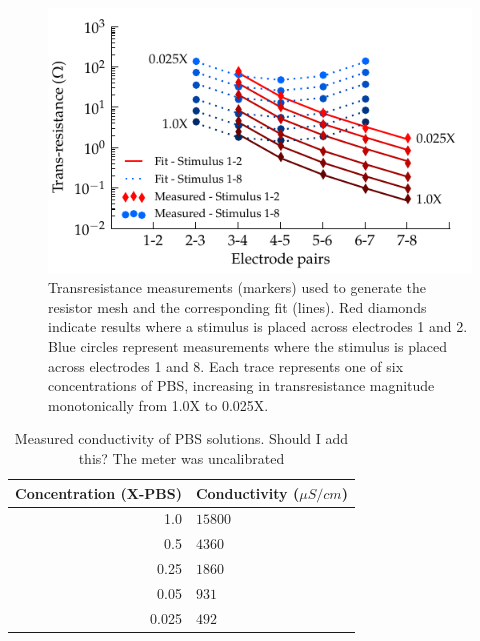 \documentclass[journal, a4paper]{IEEEtran}
\begin{document}
\begin{figure}
    \begin{center}
        \includegraphics{graphics/pbs_transimpedance_IEEE}
    \end{center}
    \caption{Transresistance measurements (markers) used to generate the resistor mesh and the corresponding fit (lines). Red diamonds indicate results where a stimulus is placed across electrodes 1 and 2. Blue circles represent measurements where the stimulus is placed across electrodes 1 and 8. Each trace represents one of six concentrations of PBS, increasing in transresistance magnitude monotonically from 1.0X to 0.025X.}
    \label{fig:transresistance}
\end{figure}

\begin{table}
    \caption{Measured conductivity of PBS solutions. {\color{red} Should I add this? The meter was uncalibrated}}
    \label{tab:PBSconductivity}
    \begin{center}
        \begin{tabular}{r | l}
            Concentration (X-PBS) & Conductivity ($\mu S/cm$)\\
            \hline
            1.0 & $15800$ \\
            0.5 & $4360$\\
            0.25 & $1860$\\
            0.05 & $931$\\
            0.025 & $492$\\
        \end{tabular}
    \end{center}
\end{table}
\end{document}

